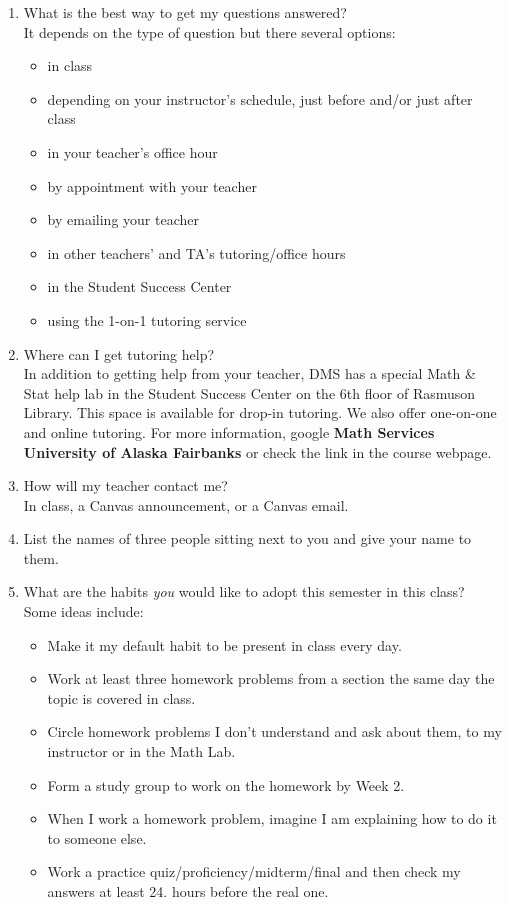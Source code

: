 \documentclass[11pt,fleqn]{article}
\begin{document}
\begin{enumerate}
\item What is the best way to get my questions answered?\\
It depends on the type of question but there several options:
\begin{itemize}
	\item in class
	\item depending on your instructor's schedule, just before and/or just after class
	\item in your teacher's office hour
	\item by appointment with your teacher
	\item by emailing your teacher
	\item in other teachers' and TA's tutoring/office hours
	\item in the Student Success Center
	\item using the 1-on-1 tutoring service
\end{itemize}

\vfill

\item Where can I get tutoring help?\\
In addition to getting help from your teacher, DMS has a special Math \& Stat help lab in the Student Success Center on the 6th floor of Rasmuson Library. This space is available for drop-in tutoring. We also offer one-on-one and online tutoring. For more information, google \textbf{Math Services University of Alaska Fairbanks} or check the link in the course webpage.\\

\item How will my teacher contact me? \\
In class, a Canvas announcement, or a Canvas email.\\

\item List the names of three people sitting next to you and give your name to them.\\

\item What are the habits \emph{you} would like to adopt this semester in this class?\\
Some ideas include:
\begin{itemize}
	\item Make it my default habit to be present in class every day.
	\item Work at least three homework problems from a section the same day the topic is covered in class.
	\item Circle homework problems I don't understand and ask about them, to my instructor or in the Math Lab.
	\item Form a study group to work on the homework by Week 2.
	\item When I work a homework problem, imagine I am explaining how to do it to someone else.
	\item Work a practice quiz/proficiency/midterm/final and then check my answers at least 24. hours before the real one.
\end{itemize}
\vfill
\end{enumerate}
\end{document}
